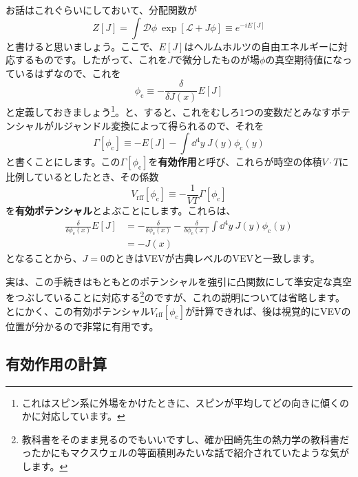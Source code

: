 \documentclass[unicode,a4paper,11pt]{ltjsarticle}
\theoremstyle{definition}
\begin{document}
お話はこれぐらいにしておいて、分配関数が
\begin{equation}
   Z[J]
   =
   \int\mathcal{D}\phi\
   \exp
   \left[
      \mathcal{L}+J\phi
      \right]
   \equiv
   e^{-i E[J]}
\end{equation}
と書けると思いましょう。ここで、$E[J]$はヘルムホルツの自由エネルギーに対応するものです。したがって、これを$J$で微分したものが場$\phi$の真空期待値になっているはずなので、これを
\begin{equation}
   \phi_{\mathrm{c}}
   \equiv
   -
   \frac{\delta}{\delta J(x)}E[J]
\end{equation}
と定義しておきましょう\footnote{
   これはスピン系に外場をかけたときに、スピンが平均してどの向きに傾くのかに対応しています。
}。と、すると、これをむしろ1つの変数だとみなすポテンシャルがルジャンドル変換によって得られるので、それを
\begin{equation}
   \Gamma[\phi_{\mathrm{c}}]
   \equiv
   -
   E[J]
   -
   \int\dd^4 y\
   J(y)\phi_{\mathrm{c}}(y)
\end{equation}
と書くことにします。この$\Gamma[\phi_{\mathrm{c}}]$を\textbf{有効作用}と呼び、これらが時空の体積$V\cdot T$に比例しているとしたとき、その係数
\begin{equation}
   V_{\mathrm{rff}}[\phi_{\mathrm{c}}]
   \equiv
   -\frac{1}{VT}\Gamma[\phi_{\mathrm{c}}]
\end{equation}
を\textbf{有効ポテンシャル}とよぶことにします。これらは、
\begin{align}
   \frac{\delta}{\delta \phi_{\mathrm{c}}(x)}E[J]
    & =
   -
   \frac{\delta}{\delta \phi_{\mathrm{c}}(x)}
   -
   \frac{\delta}{\delta \phi_{\mathrm{c}}(x)}
   \int\dd^4 y\
   J(y)\phi_{\mathrm{c}}(y)
   \nonumber
   \\
    & =
   -J(x)
\end{align}
となることから、$J=0$のときはVEVが古典レベルのVEVと一致します。

実は、この手続きはもともとのポテンシャルを強引に凸関数にして準安定な真空をつぶしていることに対応する\footnote{
   教科書をそのまま見るのでもいいですし、確か田崎先生の熱力学の教科書だったかにもマクスウェルの等面積則みたいな話で紹介されていたような気がします。
}のですが、これの説明については省略します。とにかく、この有効ポテンシャル$V_{\mathrm{rff}}[\phi_{\mathrm{c}}]$が計算できれば、後は視覚的にVEVの位置が分かるので非常に有用です。


\subsection{有効作用の計算}
\end{document}
